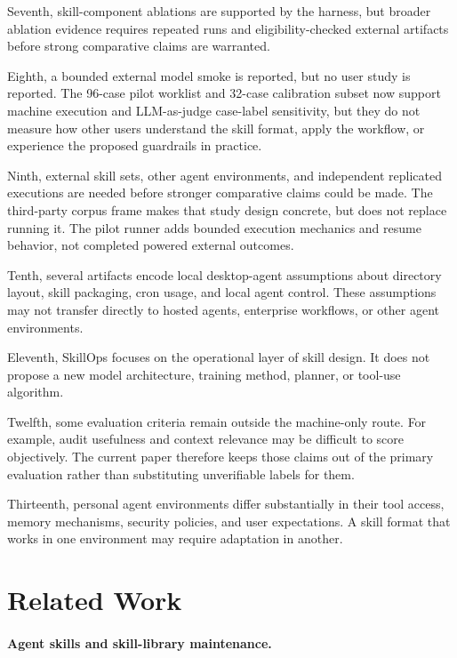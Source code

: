 \documentclass[11pt]{article}
\begin{document}
Seventh, skill-component ablations are supported by the harness, but broader
ablation evidence requires repeated runs and eligibility-checked external
artifacts before strong comparative claims are warranted.

Eighth, a bounded external model smoke is reported, but no user study is
reported. The 96-case pilot worklist and 32-case calibration subset now
support machine execution and LLM-as-judge case-label sensitivity, but they do
not measure how other users understand the skill format, apply the workflow,
or experience the proposed guardrails in practice.

Ninth, external skill sets, other agent environments, and independent
replicated executions are needed before stronger comparative claims could be
made. The third-party corpus frame makes that study design concrete, but does
not replace running it. The pilot runner adds bounded execution mechanics and
resume behavior, not completed powered external outcomes.

Tenth, several artifacts encode local desktop-agent assumptions about directory
layout, skill packaging, cron usage, and local agent control. These assumptions
may not transfer directly to hosted agents, enterprise workflows, or other
agent environments.

Eleventh, SkillOps focuses on the operational layer of skill design. It does not
propose a new model architecture, training method, planner, or tool-use
algorithm.

Twelfth, some evaluation criteria remain outside the machine-only route. For
example, audit usefulness and context relevance may be difficult to score
objectively. The current paper therefore keeps those claims out of the primary
evaluation rather than substituting unverifiable labels for them.

Thirteenth, personal agent environments differ substantially in their tool access,
memory mechanisms, security policies, and user expectations. A skill format
that works in one environment may require adaptation in another.

\section{Related Work}

\paragraph{Agent skills and skill-library maintenance.}
\end{document}
